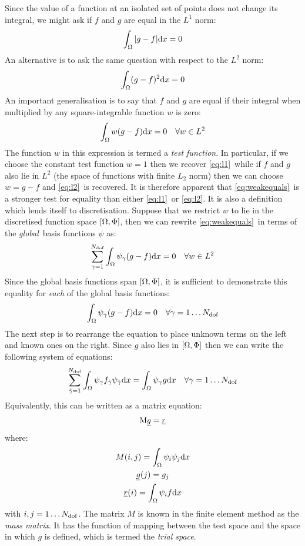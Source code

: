 \documentclass[a4paper, 11pt]{book}
\begin{document}
Since the value of a function at an isolated set of points does not change
its integral, we might ask if $f$ and $g$ are equal in the $L^1$ norm:
\begin{equation}\label{eq:l1}
  \int_\Omega|g-f|\mathrm{d} x =0
\end{equation}
An alternative is to ask the same question with respect to the $L^2$ norm:
\begin{equation}\label{eq:l2}
  \int_\Omega(g-f)^2\mathrm{d} x =0
\end{equation}
An important generalisation is to say that $f$ and $g$ are equal if their
integral when multiplied by any square-integrable function $w$ is zero:
\begin{equation}\label{eq:weakequals}
  \int_\Omega w(g-f)\mathrm{d} x =0 \quad \forall w \in L^2
\end{equation}
The function $w$ in this expression is termed a \emph{test function}. In
particular, if we choose the constant test function $w=1$ then we recover
\eqref{eq:l1}\ while if $f$ and $g$ also lie in $L^2$ (the space of
functions with finite $L_2$ norm) then we can choose $w=g-f$ and
\eqref{eq:l2}\ is recovered. It is therefore apparent that
\eqref{eq:weakequals}\ is a stronger test for equality than either
\eqref{eq:l1}\ or \eqref{eq:l2}. It is also a definition which lends itself
to discretisation. Suppose that we restrict $w$ to lie in the discretised
function space $[\Omega,\Phi]$, then we can rewrite \eqref{eq:weakequals}\
in terms of the \emph{global}\ basis functions $\psi$ as:
\begin{equation}
  \sum_{\gamma=1}^{N_\mathrm{dof}}\int_\Omega 
  \psi_{\gamma}(g-f)\mathrm{d} x = 0 \quad \forall w \in L^2
\end{equation}
Since the global basis functions span $[\Omega,\Phi]$, it is sufficient to
demonstrate this equality for \emph{each} of the global basis functions:
\begin{equation}
  \int_\Omega \psi_{\gamma}(g-f)\mathrm{d} x = 0 \quad \forall \gamma=1\ldots N_\mathrm{dof}
\end{equation}
The next step is to rearrange the equation to place unknown terms on the
left and known ones on the right. Since $g$ also lies in $[\Omega,\Phi]$
then we can write the following system of equations:
\begin{equation}
  \sum_{\hat\gamma=1}^{N_\mathrm{dof}}\int_\Omega
  \psi_{\gamma}f_{\hat\gamma}\psi_{\hat\gamma}\mathrm{d} x = 
  \int_\Omega \psi_{\gamma}g\mathrm{d} x \quad \forall \gamma=1\ldots N_\mathrm{dof}
\end{equation}
Equivalently, this can be written as a matrix equation:
\begin{equation}
  \mathrm{M}\underline{g}=\underline{r}
\end{equation}
where:
\begin{gather}
  M(i,j)=\int_\Omega\psi_i\psi_j\mathrm{d} x\label{eq:mass}\\
  \underline{g}(j)=g_j\\
  \underline{r}(i)=\int_\Omega \psi_{i}f\mathrm{d} x
\end{gather}
with $i,j=1\ldots N_\mathrm{dof}$. The matrix $M$ is known in the finite element
method as the \emph{mass matrix}. It has the function of mapping between the
test space and the space in which $g$ is defined, which is termed the \emph{trial
space}. 
\end{document}
